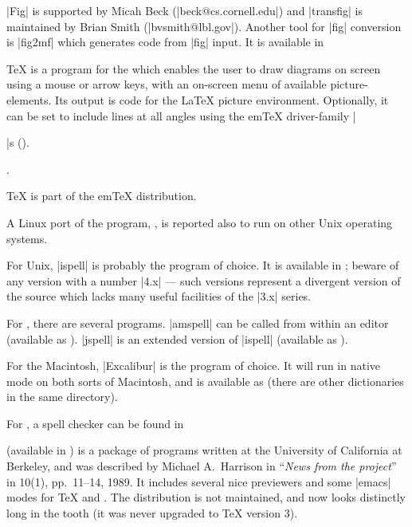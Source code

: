 \ProgName|Fig| is supported by Micah Beck (\Email|beck@cs.cornell.edu|) and
\ProgName|transfig| is maintained by Brian Smith (\Email|bvsmith@lbl.gov|). 
Another tool for \ProgName|fig| conversion is \ProgName|fig2mf| which
generates \MF{} code from \ProgName|fig| input. It is available in


\TeX{} is a program for the  which enables the user to draw diagrams
on screen using a mouse or arrow keys, with an on-screen menu of available 
picture-elements. Its output is code for the \LaTeX{} picture environment.
Optionally, it can be set to include lines at all angles using 
the em\TeX{} driver-family
\htmlignore
|\special|s ().
\endhtmlignore
\begin{htmlversion}
.
\end{htmlversion}
\TeX{} is part of the em\TeX{} distribution.

A Linux port of the program, , is reported also to
run on other Unix operating systems.


For Unix, \ProgName|ispell| is probably the program of choice. It is
available in ; beware of any version with a number
|4.x| --- such versions represent a divergent version of the source
which lacks many useful facilities of the |3.x| series.

For \MSDOS{}, there are several programs. \ProgName|amspell| can be called from within an editor (available as
).  \ProgName|jspell| is an extended version of
\ProgName|ispell| (available as ).

For the Macintosh, \ProgName|Excalibur| is the program of choice.  It
will run in native mode on both sorts of Macintosh, and is available as
 (there are other dictionaries in the same
directory).

For , a spell checker can be found in 


\VorTeX{} (available in ) is a package of programs
written at the University of
California at Berkeley, and was described by Michael A.~Harrison in
``\emph{News from the \VorTeX{} project}'' in \TUGboat{} 10(1),
pp.~11--14, 1989.  It includes several nice previewers and some
\ProgName|emacs| modes for \TeX{} and \BibTeX{}.  The \VorTeX{}
distribution is not maintained, and now looks distinctly long in the
tooth (it was never upgraded to \TeX{} version 3).

